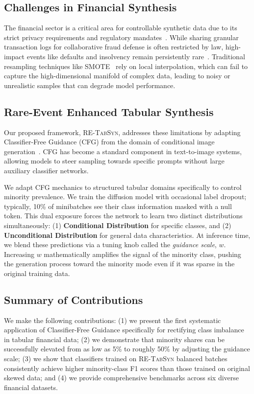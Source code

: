 \documentclass[conference]{IEEEtran}
\newcommand{\retabsyn}{\textsc{RE-TabSyn}}
\begin{document}
\subsection{Challenges in Financial Synthesis}
The financial sector is a critical area for controllable synthetic data due to its strict privacy requirements and regulatory mandates~\cite{assefa2020synthetic, sattarov2023findiff}. While sharing granular transaction logs for collaborative fraud defense is often restricted by law, high-impact events like defaults and insolvency remain persistently rare~\cite{fiore2019hybrid, nidhi2024rare}. Traditional resampling techniques like SMOTE~\cite{chawla2002smote} rely on local interpolation, which can fail to capture the high-dimensional manifold of complex data, leading to noisy or unrealistic samples that can degrade model performance.

\subsection{Rare-Event Enhanced Tabular Synthesis}
Our proposed framework, \retabsyn{}, addresses these limitations by adapting Classifier-Free Guidance (CFG) from the domain of conditional image generation~\cite{ho2022cfg}. CFG has become a standard component in text-to-image systems, allowing models to steer sampling towards specific prompts without large auxiliary classifier networks.

We adapt CFG mechanics to structured tabular domains specifically to control minority prevalence. We train the diffusion model with occasional label dropout; typically, 10\% of minibatches see their class information masked with a null token. This dual exposure forces the network to learn two distinct distributions simultaneously: (1) \textbf{Conditional Distribution} for specific classes, and (2) \textbf{Unconditional Distribution} for general data characteristics. At inference time, we blend these predictions via a tuning knob called the \textit{guidance scale}, $w$. Increasing $w$ mathematically amplifies the signal of the minority class, pushing the generation process toward the minority mode even if it was sparse in the original training data.

\subsection{Summary of Contributions}
We make the following contributions: (1) we present the first systematic application of Classifier-Free Guidance specifically for rectifying class imbalance in tabular financial data; (2) we demonstrate that minority shares can be successfully elevated from as low as 5\% to roughly 50\% by adjusting the guidance scale; (3) we show that classifiers trained on \retabsyn{} balanced batches consistently achieve higher minority-class F1 scores than those trained on original skewed data; and (4) we provide comprehensive benchmarks across six diverse financial datasets.
\end{document}
